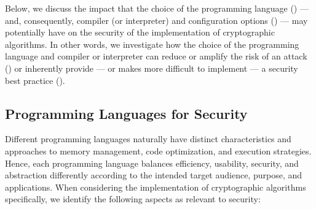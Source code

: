 Below, we discuss the impact that the choice of the programming language () --- and, consequently, compiler (or interpreter) and configuration options () --- may potentially have on the security of the implementation of cryptographic algorithms. In other words, we investigate how the choice of the programming language and compiler or interpreter can reduce or amplify the risk of an attack () or inherently provide --- or makes more difficult to implement --- a security best practice ().


\subsection{Programming Languages for Security}\label{sec:programming_languages_and_software:languages}

Different programming languages naturally have distinct characteristics and approaches to memory management, code optimization, and execution strategies. Hence, each programming language balances efficiency, usability, security, and abstraction differently according to the intended target audience, purpose, and applications. When considering the implementation of cryptographic algorithms specifically, we identify the following aspects as relevant to security:

